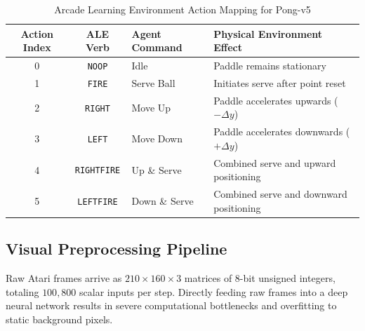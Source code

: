 \documentclass[12pt,a4paper]{report}
\begin{document}
\begin{table}[htbp]
\centering
\caption{Arcade Learning Environment Action Mapping for Pong-v5}
\label{tab:action_space}
\begin{tabular}{@{}cclp{7.0cm}@{}}
\toprule
\textbf{Action Index} & \textbf{ALE Verb} & \textbf{Agent Command} & \textbf{Physical Environment Effect} \\ \midrule
0 & \texttt{NOOP} & Idle & Paddle remains stationary \\
1 & \texttt{FIRE} & Serve Ball & Initiates serve after point reset \\
2 & \texttt{RIGHT} & Move Up & Paddle accelerates upwards ($-\Delta y$) \\
3 & \texttt{LEFT} & Move Down & Paddle accelerates downwards ($+\Delta y$) \\
4 & \texttt{RIGHTFIRE} & Up \& Serve & Combined serve and upward positioning \\
5 & \texttt{LEFTFIRE} & Down \& Serve & Combined serve and downward positioning \\ \bottomrule
\end{tabular}
\end{table}

\subsection{Visual Preprocessing Pipeline}
Raw Atari frames arrive as $210 \times 160 \times 3$ matrices of 8-bit unsigned integers, totaling $100,800$ scalar inputs per step. Directly feeding raw frames into a deep neural network results in severe computational bottlenecks and overfitting to static background pixels. 
\end{document}

